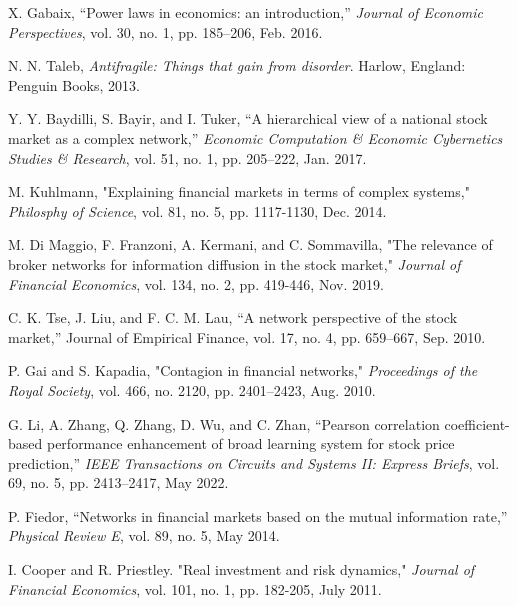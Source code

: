 \documentclass[letterpaper, 11 pt, proceedings]{IEEEtran}
\begin{document}
	
	\begin{thebibliography}{99}	
		X. Gabaix, “Power laws in economics: an introduction,” \textit{Journal of Economic Perspectives}, vol. 30, no. 1, pp. 185–206, Feb. 2016.
		
		N. N. Taleb, \textit{Antifragile: Things that gain from disorder}. Harlow, England: Penguin Books, 2013.
		
		Y. Y. Baydilli, S. Bayir, and I. Tuker, “A hierarchical view of a national stock market as a complex network,” \textit{Economic Computation \& Economic Cybernetics Studies \& Research}, vol. 51, no. 1, pp. 205–222, Jan. 2017.

		M. Kuhlmann, "Explaining financial markets in terms of complex systems," \textit{Philosphy of Science}, vol. 81, no. 5, pp. 1117-1130, Dec. 2014. %
		
		M. Di Maggio, F. Franzoni, A. Kermani, and C. Sommavilla, "The relevance of broker networks for information diffusion in the stock market," \textit{Journal of Financial Economics}, vol. 134, no. 2, pp. 419-446, Nov. 2019. %

		C. K. Tse, J. Liu, and F. C. M. Lau, “A network perspective of the stock market,” Journal of Empirical Finance, vol. 17, no. 4, pp. 659–667, Sep. 2010.

		P. Gai and S. Kapadia, "Contagion in financial networks," \textit{Proceedings of the Royal Society}, vol. 466, no. 2120, pp. 2401–2423, Aug. 2010.

		G. Li, A. Zhang, Q. Zhang, D. Wu, and C. Zhan, “Pearson correlation coefficient-based performance enhancement of broad learning system for stock price prediction,” \textit{IEEE Transactions on Circuits and Systems II: Express Briefs}, vol. 69, no. 5, pp. 2413–2417, May 2022. %
		
		P. Fiedor, “Networks in financial markets based on the mutual information rate,” \textit{Physical Review E}, vol. 89, no. 5, May 2014. %
		
		I. Cooper and R. Priestley. "Real investment and risk dynamics," \textit{Journal of Financial Economics}, vol. 101, no. 1, pp. 182-205, July 2011.
		

\end{thebibliography}
\end{document}
